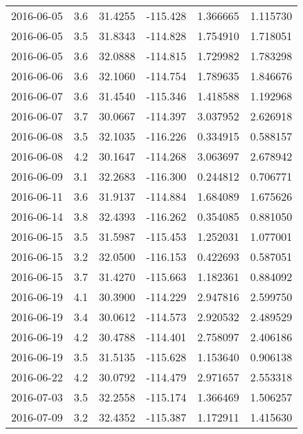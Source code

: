 \begin{tabular}{lrrrrr}
2016-06-05 &       3.6 &  31.4255 &  -115.428 &         1.366665 &         1.115730 \\
2016-06-05 &       3.5 &  31.8343 &  -114.828 &         1.754910 &         1.718051 \\
2016-06-05 &       3.6 &  32.0888 &  -114.815 &         1.729982 &         1.783298 \\
2016-06-06 &       3.6 &  32.1060 &  -114.754 &         1.789635 &         1.846676 \\
2016-06-07 &       3.6 &  31.4540 &  -115.346 &         1.418588 &         1.192968 \\
2016-06-07 &       3.7 &  30.0667 &  -114.397 &         3.037952 &         2.626918 \\
2016-06-08 &       3.5 &  32.1035 &  -116.226 &         0.334915 &         0.588157 \\
2016-06-08 &       4.2 &  30.1647 &  -114.268 &         3.063697 &         2.678942 \\
2016-06-09 &       3.1 &  32.2683 &  -116.300 &         0.244812 &         0.706771 \\
2016-06-11 &       3.6 &  31.9137 &  -114.884 &         1.684089 &         1.675626 \\
2016-06-14 &       3.8 &  32.4393 &  -116.262 &         0.354085 &         0.881050 \\
2016-06-15 &       3.5 &  31.5987 &  -115.453 &         1.252031 &         1.077001 \\
2016-06-15 &       3.2 &  32.0500 &  -116.153 &         0.422693 &         0.587051 \\
2016-06-15 &       3.7 &  31.4270 &  -115.663 &         1.182361 &         0.884092 \\
2016-06-19 &       4.1 &  30.3900 &  -114.229 &         2.947816 &         2.599750 \\
2016-06-19 &       3.4 &  30.0612 &  -114.573 &         2.920532 &         2.489529 \\
2016-06-19 &       4.2 &  30.4788 &  -114.401 &         2.758097 &         2.406186 \\
2016-06-19 &       3.5 &  31.5135 &  -115.628 &         1.153640 &         0.906138 \\
2016-06-22 &       4.2 &  30.0792 &  -114.479 &         2.971657 &         2.553318 \\
2016-07-03 &       3.5 &  32.2558 &  -115.174 &         1.366469 &         1.506257 \\
2016-07-09 &       3.2 &  32.4352 &  -115.387 &         1.172911 &         1.415630 \\

\end{tabular}
